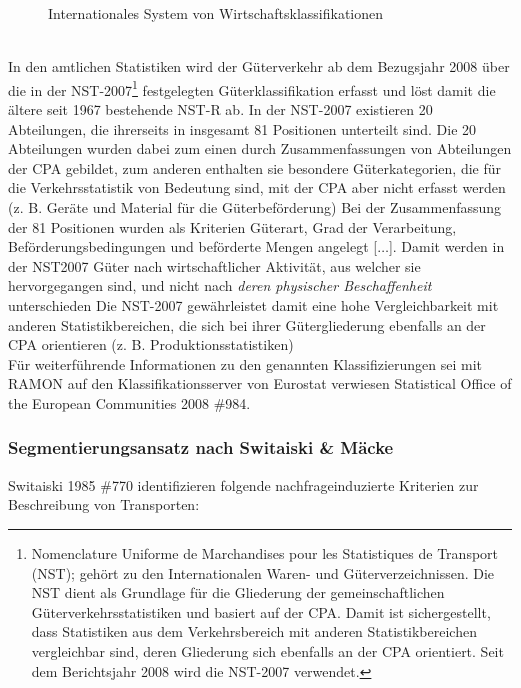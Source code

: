 \begin{figure}[htbp]
  \centering
  \caption{ Internationales System von Wirtschaftsklassifikationen}
  \label{_Ref365555687}
\end{figure}
~\\
In den amtlichen Statistiken wird der Güterverkehr ab dem Bezugsjahr 2008 über die in der NST-2007\footnote{%
 \glqq Nomenclature Uniforme de Marchandises pour les Statistiques de Transport (NST); gehört zu den Internationalen Waren- und Güterverzeichnissen. Die NST dient als Grundlage für die Gliederung der gemeinschaftlichen Güterverkehrsstatistiken und basiert auf der CPA. Damit ist sichergestellt, dass Statistiken aus dem Verkehrsbereich mit anderen Statistikbereichen vergleichbar sind, deren Gliederung sich ebenfalls an der CPA orientiert. Seit dem Berichtsjahr 2008 wird die NST-2007 verwendet.
}%
 festgelegten Güterklassifikation erfasst und löst damit die ältere seit 1967 bestehende NST-R ab. In der NST-2007 existieren 20 Abteilungen, die ihrerseits in insgesamt 81 Positionen unterteilt sind. Die 20 Abteilungen wurden dabei \glqq zum einen durch Zusammenfassungen von Abteilungen der CPA gebildet, zum anderen enthalten sie besondere Güterkategorien, die für die Verkehrsstatistik von Bedeutung sind, mit der CPA aber nicht erfasst werden (z. B. Geräte und Material für die Güterbeförderung)\grqq   \autocites[][]{bib.980} \glqq Bei der Zusammenfassung der 81 Positionen wurden als Kriterien Güterart, Grad der Verarbeitung, Beförderungsbedingungen und beförderte Mengen angelegt [$\ldots$]. Damit werden in der NST2007 Güter nach wirtschaftlicher Aktivität, \glqq aus welcher sie hervorgegangen sind\grqq  , und nicht nach \emph{deren physischer Beschaffenheit} unterschieden  \autocites[][]{bib.981} Die NST-2007 \glqq gewährleistet damit eine hohe Vergleichbarkeit mit anderen Statistikbereichen, die sich bei ihrer Gütergliederung ebenfalls an der CPA orientieren (z. B. Produktionsstatistiken)\grqq   \autocites[][]{bib.980}~\\
Für weiterführende Informationen zu den genannten Klassifizierungen sei mit RAMON auf den Klassifikationsserver von Eurostat verwiesen {Statistical Office of the European Communities 2008 \#984}.~\\


% 
\subsubsection{Segmentierungsansatz nach Switaiski \& Mäcke}
\label{_Toc366766090}
\label{_Toc366775284}
{Switaiski 1985 \#770} identifizieren folgende nachfrageinduzierte Kriterien zur Beschreibung von Transporten:~\\

